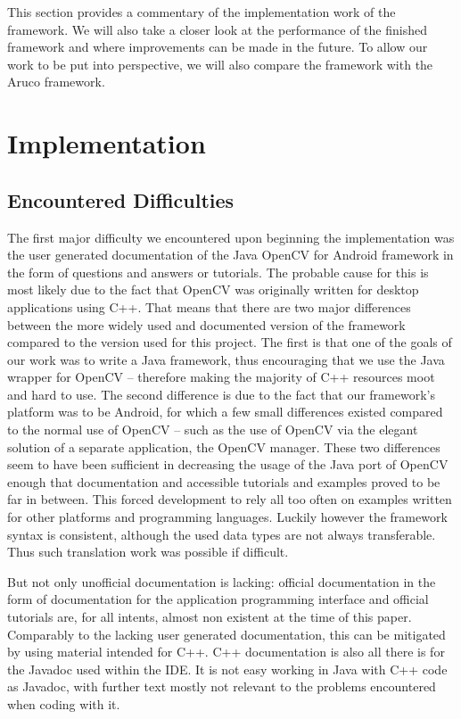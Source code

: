 This section provides a commentary of the implementation work of the framework.
We will also take a closer look at the performance of the finished framework and where improvements can be made in the future.
To allow our work to be put into perspective, we will also compare the framework with the Aruco framework.

\section{Implementation}
\label{implementation}

\subsection{Encountered Difficulties}

The first major difficulty we encountered upon beginning the implementation was the user generated documentation of the Java OpenCV for Android framework in the form of questions and answers or tutorials.
The probable cause for this is most likely due to the fact that OpenCV was originally written for desktop applications using C++.
That means that there are two major differences between the more widely used and documented version of the framework compared to the version used for this project.
The first is that one of the goals of our work was to write a Java framework, thus encouraging that we use the Java wrapper for OpenCV – therefore making the majority of C++ resources moot and hard to use.
The second difference is due to the fact that our framework's platform was to be Android, for which a few small differences existed compared to the normal use of OpenCV – such as the use of OpenCV via the elegant solution of a separate application, the OpenCV manager.
These two differences seem to have been sufficient in decreasing the usage of the Java port of OpenCV enough that documentation and accessible tutorials and examples proved to be far in between.
This forced development to rely all too often on examples written for other platforms and programming languages.
Luckily however the framework syntax is consistent, although the used data types are not always transferable.
Thus such translation work was possible if difficult.

But not only unofficial documentation is lacking: official documentation in the form of documentation for the application programming interface and official tutorials are, for all intents, almost non existent at the time of this paper.
Comparably to the lacking user generated documentation, this can be mitigated by using material intended for C++.
C++ documentation is also all there is for the Javadoc used within the IDE.
It is not easy working in Java with C++ code as Javadoc, with further text mostly not relevant to the problems encountered when coding with it.

